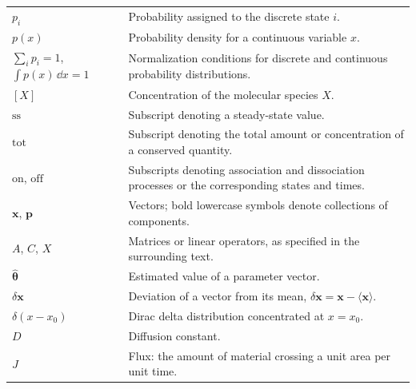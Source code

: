 {\begin{longtable}{@{}p{}p{}@{}}
$p_i$ & Probability assigned to the discrete state $i$. \\

$p(x)$ & Probability density for a continuous variable $x$. \\

$\sum_i p_i=1$, $\int p(x)\,\dd x=1$ & Normalization conditions for discrete and continuous probability distributions. \\

$[X]$ & Concentration of the molecular species $X$. \\

$\mathrm{ss}$ & Subscript denoting a steady-state value. \\

$\mathrm{tot}$ & Subscript denoting the total amount or concentration of a conserved quantity. \\

$\mathrm{on}$, $\mathrm{off}$ & Subscripts denoting association and dissociation processes or the corresponding states and times. \\


$\mathbf{x}$, $\mathbf{p}$ & Vectors; bold lowercase symbols denote collections of components. \\

$A$, $C$, $X$ & Matrices or linear operators, as specified in the surrounding text. \\


$\hat{\boldsymbol{\theta}}$ & Estimated value of a parameter vector. \\

$\delta\mathbf{x}$ & Deviation of a vector from its mean, $\delta\mathbf{x}=\mathbf{x}-\langle\mathbf{x}\rangle$. \\

$\delta(x-x_0)$ & Dirac delta distribution concentrated at $x=x_0$. \\

$D$ & Diffusion constant. \\

$J$ & Flux: the amount of material crossing a unit area per unit time. \\


\end{longtable}}
